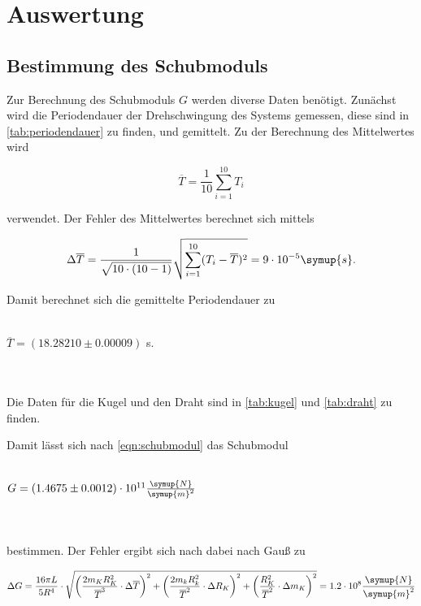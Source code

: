 \section{Auswertung}
\label{sec:Auswertung}
\subsection{Bestimmung des Schubmoduls}



Zur Berechnung des Schubmoduls $G$ werden diverse Daten benötigt. Zunächst wird die Periodendauer der Drehschwingung des Systems gemessen, diese sind in \autoref{tab:periodendauer} zu finden, und gemittelt.
Zu der Berechnung des Mittelwertes wird 

\begin{equation}
  \label{eqn:mittelwert}
  \overline{T} = \frac{1}{10} \sum_{i=1}^{10} T_i
\end{equation}

verwendet. Der Fehler des Mittelwertes berechnet sich mittels 

\begin{equation}
  \label{eqn:FehlerMittelwert}
  \Delta \overline{T} = \frac{1}{\sqrt{10 \cdot (10-1)}} \sqrt{ \sum_{i=1}^{10} (T_i - \overline{T})^2} = 9 \cdot 10^{-5} \symup{s}.
\end{equation}

Damit berechnet sich die gemittelte Periodendauer zu
\\ \\
\centerline{$\overline{T} = (18.28210 \pm 0.00009)$ s.}
\\ \\
Die Daten für die Kugel und den Draht sind in \autoref{tab:kugel} und \autoref{tab:draht} zu finden.





Damit lässt sich nach \eqref{eqn:schubmodul} das Schubmodul
\\ \\
\centerline{$G = (1.4675 \pm 0.0012) \cdot 10^{11} \frac{\symup{N}}{\symup{m}^2}$}
\\ \\
bestimmen. Der Fehler ergibt sich nach dabei nach Gauß zu

\begin{equation}
 \Delta G = \frac{16 \pi L}{5 R^4} \cdot \sqrt{ \bigg( \frac{2 m_K R_K^2}{\overline{T}^3} \cdot \Delta \overline{T} \bigg)^2 + \bigg( \frac{2 m_k R_k^2}{\overline{T}^2} \cdot \Delta R_K \bigg)^2 + \bigg( \frac{R_K^2}{\overline{T}^2} \cdot \Delta m_K \bigg)^2} = 1.2 \cdot 10^{8} \frac{\symup{N}}{\symup{m}^2}
\end{equation}

